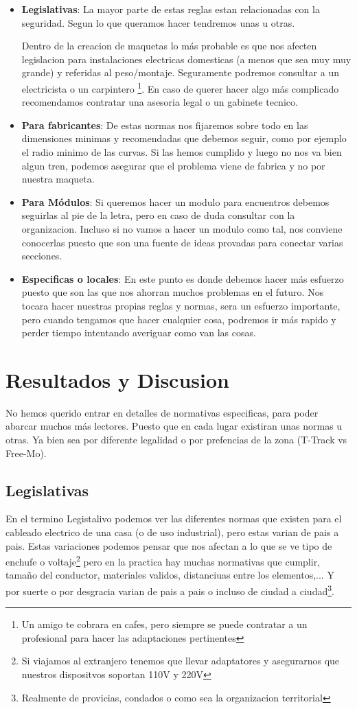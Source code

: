 \begin{itemize}
	\item \textbf{Legislativas}: La mayor parte de estas reglas estan relacionadas con la seguridad. Segun lo que queramos hacer tendremos unas u otras.  

Dentro de la creacion de maquetas lo más probable es que nos afecten legislacion para instalaciones electricas domesticas (a menos que sea muy muy grande) y referidas al peso/montaje. Seguramente podremos consultar a un electricista o un carpintero \footnote{Un amigo te cobrara en cafes, pero siempre se puede contratar a un profesional para hacer las adaptaciones pertinentes}. En caso de querer hacer algo más complicado recomendamos contratar una asesoria legal o un gabinete tecnico.  
	\item \textbf{Para fabricantes}: De estas normas nos fijaremos sobre todo en las dimensiones minimas y recomendadas que debemos seguir, como por ejemplo el radio minimo de las curvas. Si las hemos cumplido y luego no nos va bien algun tren, podemos asegurar que el problema viene de fabrica y no por nuestra maqueta.
	\item \textbf{Para Módulos}: Si queremos hacer un modulo para encuentros debemos seguirlas al pie de la letra, pero en caso de duda consultar con la organizacion. Incluso si no vamos a hacer un modulo como tal, nos conviene conocerlas puesto que son una fuente de ideas provadas para conectar varias secciones. 
	\item \textbf{Especificas o locales}: En este punto es donde debemos hacer más esfuerzo puesto que son las que nos ahorran muchos problemas en el futuro. Nos tocara hacer nuestras propias reglas y normas, sera un esfuerzo importante, pero cuando tengamos que hacer cualquier cosa, podremos ir más rapido y perder tiempo intentando averiguar como van las cosas.
\end{itemize}

\section{Resultados y Discusion} 
No hemos querido entrar en detalles de normativas especificas, para poder abarcar muchos más lectores. Puesto que en cada lugar existiran unas normas u otras. Ya bien sea por diferente legalidad o por prefencias de la zona (T-Track vs Free-Mo).

\subsection{Legislativas}
En el termino Legistalivo podemos ver las diferentes normas que existen para el cableado electrico de una casa (o de uso industrial), pero estas varian de pais a pais. Estas variaciones podemos pensar que nos afectan a lo que se ve tipo de enchufe o voltaje\footnote{Si viajamos al extranjero tenemos que llevar adaptatores y asegurarnos que nuestros dispositvos soportan 110V y 220V}
pero en la practica hay muchas normativas que cumplir, tamaño del conductor, materiales validos, distanciuas entre los elementos,... Y por suerte o por desgracia varian de pais a pais o incluso de ciudad a ciudad\footnote{Realmente de provicias, condados o como sea la organizacion territorial}.

